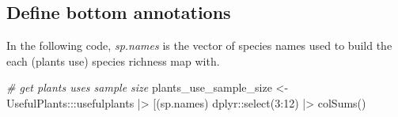 \documentclass[
]{article}
\newenvironment{Shaded}{\begin{snugshade}}{\end{snugshade}}
\newcommand{\AttributeTok}[1]{\textcolor[rgb]{0.77,0.63,0.00}{#1}}
\newcommand{\CommentTok}[1]{\textcolor[rgb]{0.56,0.35,0.01}{\textit{#1}}}
\newcommand{\DecValTok}[1]{\textcolor[rgb]{0.00,0.00,0.81}{#1}}
\newcommand{\FunctionTok}[1]{\textcolor[rgb]{0.00,0.00,0.00}{#1}}
\newcommand{\NormalTok}[1]{#1}
\newcommand{\OtherTok}[1]{\textcolor[rgb]{0.56,0.35,0.01}{#1}}
\newcommand{\SpecialCharTok}[1]{\textcolor[rgb]{0.00,0.00,0.00}{#1}}
\newcommand{\StringTok}[1]{\textcolor[rgb]{0.31,0.60,0.02}{#1}}
\begin{document}
\hypertarget{define-bottom-annotations}{%
\subsection{Define bottom annotations}\label{define-bottom-annotations}}

In the following code, \emph{sp.names} is the vector of species names
used to build the each (plants use) species richness map with.

\begin{Shaded}
\begin{Highlighting}[]

\CommentTok{\# get plants uses sample size}
\NormalTok{plants\_use\_sample\_size }\OtherTok{\textless{}{-}}\NormalTok{  UsefulPlants}\SpecialCharTok{:::}\NormalTok{usefulplants }\SpecialCharTok{|\textgreater{}} 
   \StringTok{\textasciigrave{}}\AttributeTok{[}\StringTok{\textasciigrave{}}\NormalTok{(sp.names)}
\NormalTok{   dplyr}\SpecialCharTok{::}\FunctionTok{select}\NormalTok{(}\DecValTok{3}\SpecialCharTok{:}\DecValTok{12}\NormalTok{) }\SpecialCharTok{|\textgreater{}}
   \FunctionTok{colSums}\NormalTok{()}



\end{Highlighting}
\end{Shaded}
\end{document}
